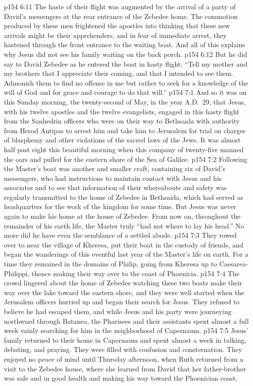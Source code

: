 \vs p154 6:11 The haste of their flight was augmented by the arrival of a party of David’s messengers at the rear entrance of the Zebedee home. The commotion produced by these men frightened the apostles into thinking that these new arrivals might be their apprehenders, and in fear of immediate arrest, they hastened through the front entrance to the waiting boat. And all of this explains why Jesus did not see his family waiting on the back porch.\plusone
\vs p154 6:12 But he did say to David Zebedee as he entered the boat in hasty flight: \textcolor{ubdarkred}{“Tell my mother and my brothers that I appreciate their coming, and that I intended to see them. Admonish them to find no offense in me but rather to seek for a knowledge of the will of God and for grace and courage to do that will.”}
\vs p154 7:1 And so it was on this Sunday morning, the twenty\hyp{}second of May, in the year A.D.~29, that Jesus, with his twelve apostles and the twelve evangelists, engaged in this hasty flight from the Sanhedrin officers who were on their way to Bethsaida with authority from Herod Antipas to arrest him and take him to Jerusalem for trial on charges of blasphemy and other violations of the sacred laws of the Jews. It was almost half past eight this beautiful morning when this company of twenty\hyp{}five manned the oars and pulled for the eastern shore of the Sea of Galilee.
\vs p154 7:2 Following the Master’s boat was another and smaller craft, containing six of David’s messengers, who had instructions to maintain contact with Jesus and his associates and to see that information of their whereabouts and safety was regularly transmitted to the home of Zebedee in Bethsaida, which had served as headquarters for the work of the kingdom for some time. But Jesus was never again to make his home at the house of Zebedee. From now on, throughout the remainder of his earth life, the Master truly “had not where to lay his head.” No more did he have even the semblance of a settled abode.
\vs p154 7:3 They rowed over to near the village of Kheresa, put their boat in the custody of friends, and began the wanderings of this eventful last year of the Master’s life on earth. For a time they remained in the domains of Philip, going from Kheresa up to Caesarea\hyp{}Philippi, thence making their way over to the coast of Phoenicia.
\pc \vs p154 7:4 The crowd lingered about the home of Zebedee watching these two boats make their way over the lake toward the eastern shore, and they were well started when the Jerusalem officers hurried up and began their search for Jesus. They refused to believe he had escaped them, and while Jesus and his party were journeying northward through Batanea, the Pharisees and their assistants spent almost a full week vainly searching for him in the neighborhood of Capernaum.\plusone
\vs p154 7:5 Jesus’ family returned to their home in Capernaum and spent almost a week in talking, debating, and praying. They were filled with confusion and consternation. They enjoyed no peace of mind until Thursday afternoon, when Ruth returned from a visit to the Zebedee house, where she learned from David that her father\hyp{}brother was safe and in good health and making his way toward the Phoenician coast.

